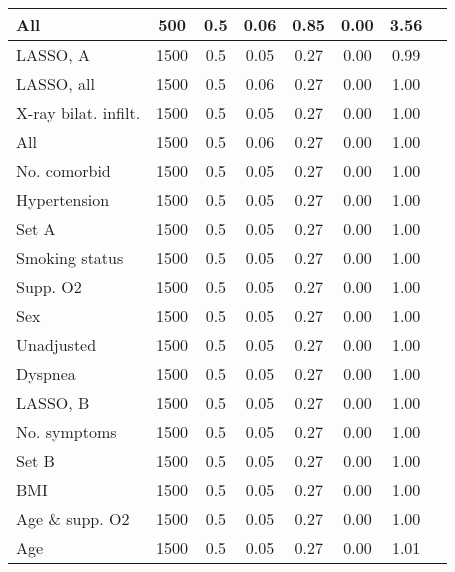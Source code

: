 \documentclass{article}
\begin{document}
{\begin{longtable}{lccccccc}
All & 500 & 0.5 & 0.06 & 0.85 & 0.00 & 3.56\\ \midrule
LASSO, A & 1500 & 0.5 & 0.05 & 0.27 & 0.00 & 0.99\\
LASSO, all & 1500 & 0.5 & 0.06 & 0.27 & 0.00 & 1.00\\
X-ray bilat. infilt. & 1500 & 0.5 & 0.05 & 0.27 & 0.00 & 1.00\\
All & 1500 & 0.5 & 0.06 & 0.27 & 0.00 & 1.00\\
No. comorbid & 1500 & 0.5 & 0.05 & 0.27 & 0.00 & 1.00\\
Hypertension & 1500 & 0.5 & 0.05 & 0.27 & 0.00 & 1.00\\
Set A & 1500 & 0.5 & 0.05 & 0.27 & 0.00 & 1.00\\
Smoking status & 1500 & 0.5 & 0.05 & 0.27 & 0.00 & 1.00\\
Supp. O2 & 1500 & 0.5 & 0.05 & 0.27 & 0.00 & 1.00\\
Sex & 1500 & 0.5 & 0.05 & 0.27 & 0.00 & 1.00\\
Unadjusted & 1500 & 0.5 & 0.05 & 0.27 & 0.00 & 1.00\\
Dyspnea & 1500 & 0.5 & 0.05 & 0.27 & 0.00 & 1.00\\
LASSO, B & 1500 & 0.5 & 0.05 & 0.27 & 0.00 & 1.00\\
No. symptoms & 1500 & 0.5 & 0.05 & 0.27 & 0.00 & 1.00\\
Set B & 1500 & 0.5 & 0.05 & 0.27 & 0.00 & 1.00\\
BMI & 1500 & 0.5 & 0.05 & 0.27 & 0.00 & 1.00\\
Age \& supp. O2 & 1500 & 0.5 & 0.05 & 0.27 & 0.00 & 1.00\\
Age & 1500 & 0.5 & 0.05 & 0.27 & 0.00 & 1.01\\
\bottomrule
\hline
\end{longtable}
}

\clearpage
\end{document}
